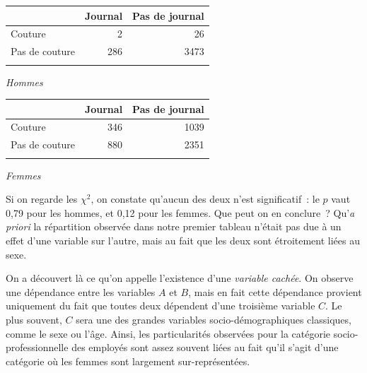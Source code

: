 \documentclass[a4paper,10pt,twoside,francais]{report}
\newcommand{\chid}{$\chi^2$\xspace}
\begin{document}
\begin{center}
  \hfill
  \begin{minipage}[c]{.46\linewidth}
    \begin{center}
      \begin{tabular}[!h]{lrr}
        \toprule
        & Journal & Pas de journal \\
        \midrule
        Couture & 2 & 26 \\
        Pas de couture & 286 & 3473 \\
        \bottomrule\\
      \end{tabular}
      \textit{Hommes}
    \end{center}
  \end{minipage} 
  \hfill
  \begin{minipage}[c]{.46\linewidth}
    \begin{center}
      \begin{tabular}[!h]{lrr}
        \toprule
        & Journal & Pas de journal \\
        \midrule
        Couture & 346 & 1039 \\
        Pas de couture & 880 & 2351 \\
        \bottomrule\\
      \end{tabular}
      \textit{Femmes}
    \end{center}
  \end{minipage}
  \hfill
\end{center}

Si on regarde les \chid, on constate qu'aucun des deux n'est
significatif~: le $p$ vaut 0,79 pour les hommes, et 0,12 pour les
femmes. Que peut on en conclure~? Qu'\textit{a priori} la répartition observée
dans notre premier tableau n'était pas due à un effet d'une variable
sur l'autre, mais au fait que les deux sont étroitement liées au
sexe.

On a découvert là ce qu'on appelle l'existence d'une \textit{variable
  cachée}. On observe une dépendance entre les variables $A$ et $B$,
mais en fait cette dépendance provient uniquement du fait que toutes
deux dépendent d'une troisième variable $C$. Le plus souvent, $C$ sera
une des grandes variables socio-démographiques classiques, comme le
sexe ou l'âge. Ainsi, les particularités observées pour la
catégorie socio-professionnelle des employés sont assez souvent liées
au fait qu'il s'agit d'une catégorie où les femmes sont largement
sur-représentées.
\end{document}
